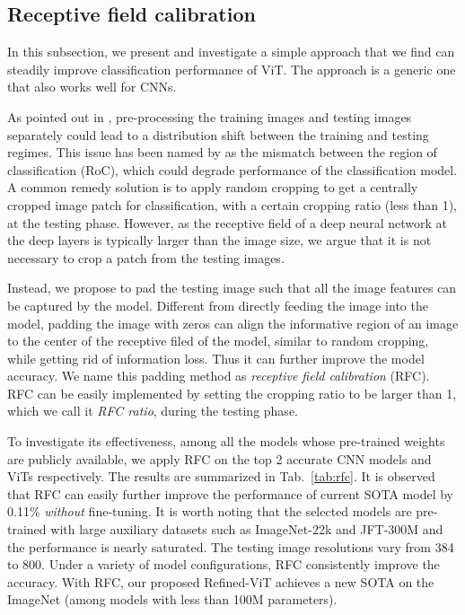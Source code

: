 \subsection{Receptive field calibration}
In this subsection, we present and investigate a simple approach that we find can steadily improve classification performance of  ViT. The approach is a generic one that also works well for CNNs. 

As pointed out in \cite{touvron2019fixing}, pre-processing the training images and testing images separately could lead to a distribution shift between the training and testing regimes. This issue has been named by \cite{touvron2019fixing} as the mismatch between the region of classification (RoC),
which could degrade   performance of the classification model. 
A common remedy solution is to apply random cropping to get a centrally cropped image patch for classification,  with a certain cropping ratio (less than 1),  at the testing phase. 
However, as the receptive field of a  deep neural network  at the deep layers is typically larger than the image size, we argue that it is not necessary to crop a patch from the testing images.  

Instead, we propose to pad the testing image such that all the image features can be captured by the model.   Different from directly feeding the image into the model, padding the image with zeros can align the informative region of an image to the center of the receptive filed of the model, similar to random cropping, while getting rid of information loss. Thus it can  further improve the model accuracy.  We name this padding method as \textit{receptive field calibration} (RFC).  RFC can be easily implemented by setting the cropping ratio to be larger than 1, which we call it \textit{RFC ratio},  during the testing phase. 

To investigate its effectiveness, among all the models whose pre-trained weights are publicly available, we apply RFC on the top 2 accurate CNN models  and ViTs respectively. The results are summarized in Tab.~\ref{tab:rfc}. It is observed that RFC can easily further improve the performance of current SOTA model  by 0.11\% \textit{without} fine-tuning.  It is worth noting that the selected models are pre-trained with large auxiliary datasets such as ImageNet-22k and JFT-300M and the performance is nearly saturated. The testing image resolutions   vary from 384 to 800. Under a variety of model configurations, RFC consistently improve the accuracy. With RFC, our proposed Refined-ViT achieves a new SOTA on the ImageNet (among models with less than 100M parameters). 

